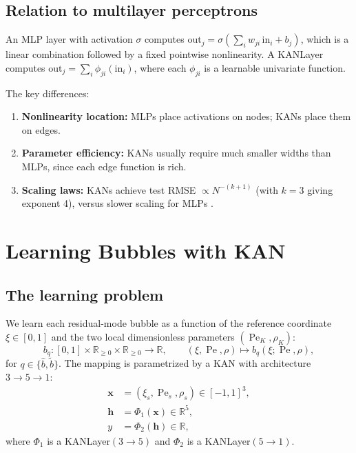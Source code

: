 \documentclass[11pt]{article}
\newcommand{\R}{\mathbb{R}}
\newcommand{\Pe}{\operatorname{Pe}}
\theoremstyle{remark}
\begin{document}
\subsection{Relation to multilayer perceptrons}

An MLP layer with activation $\sigma$ computes $\mathrm{out}_j = \sigma(\sum_i w_{ji}\,\mathrm{in}_i + b_j)$, which is a linear combination followed by a fixed pointwise nonlinearity. A KANLayer computes $\mathrm{out}_j = \sum_i \phi_{ji}(\mathrm{in}_i)$, where each $\phi_{ji}$ is a learnable univariate function.

The key differences:
\begin{enumerate}[nosep]
    \item \textbf{Nonlinearity location:} MLPs place activations on nodes; KANs place them on edges.
    \item \textbf{Parameter efficiency:} KANs usually require much smaller widths than MLPs, since each edge function is rich.
    \item \textbf{Scaling laws:} KANs achieve test RMSE $\propto N^{-(k+1)}$ (with $k = 3$ giving exponent 4), versus slower scaling for MLPs \cite{liu2024kan}.
\end{enumerate}

\section{Learning Bubbles with KAN}
\label{sec:learning}

\subsection{The learning problem}

We learn each residual-mode bubble as a function of the reference coordinate $\xi \in [0,1]$ and the two local dimensionless parameters $(\Pe_K, \rho_K)$:
\begin{equation}
b_q : [0,1] \times \R_{\geq 0} \times \R_{\geq 0} \to \R, \qquad (\xi, \Pe, \rho) \mapsto b_q(\xi; \Pe, \rho),
\end{equation}
for $q \in \{\widehat{b}, \widetilde{b}\}$. The mapping is parametrized by a KAN with architecture $3 \to 5 \to 1$:
\begin{align}
\mathbf{x} &= (\xi_s, \Pe_s, \rho_s) \in [-1,1]^3, \label{eq:input}\\
\mathbf{h} &= \Phi_1(\mathbf{x}) \in \R^5, \label{eq:hidden}\\
y &= \Phi_2(\mathbf{h}) \in \R, \label{eq:output}
\end{align}
where $\Phi_1$ is a KANLayer$(3 \to 5)$ and $\Phi_2$ is a KANLayer$(5 \to 1)$.
\end{document}
